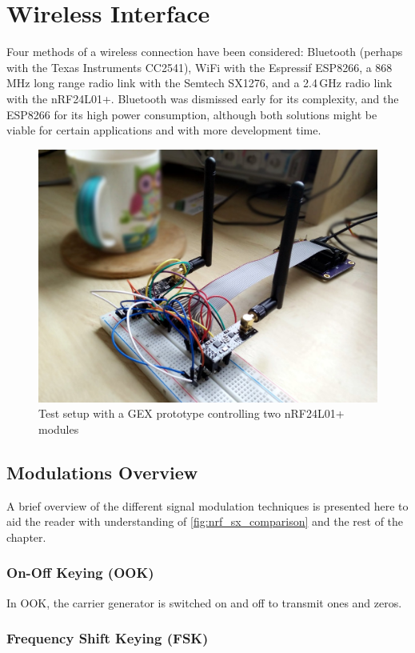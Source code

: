 \chapter{Wireless Interface} \label{sec:wireless}

Four methods of a wireless connection have been considered: Bluetooth (perhaps with the Texas Instruments CC2541), WiFi with the Espressif ESP8266, a 868\,MHz long range radio link with the Semtech SX1276, and a 2.4\,GHz radio link with the nRF24L01+. Bluetooth was dismissed early for its complexity, and the ESP8266 for its high power consumption, although both solutions might be viable for certain applications and with more development time.

\begin{figure}[h]
	\centering
	\includegraphics[width=.7\textwidth]{img/nrf-testing.jpg}
	\caption{Test setup with a GEX prototype controlling two nRF24L01+ modules}
\end{figure}

\section{Modulations Overview}

A brief overview of the different signal modulation techniques is presented here to aid the reader with understanding of \cref{fig:nrf_sx_comparison} and the rest of the chapter.

\subsection{On-Off Keying (OOK)}

In \gls{OOK}, the carrier generator is switched on and off to transmit ones and zeros.

\subsection{Frequency Shift Keying (FSK)}

